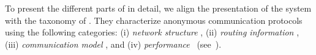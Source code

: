 

To present the different parts of \name in detail, 
we align the presentation of the system with the taxonomy of 
\textcite{RoutingSurveyAnonymousProtocols}.
They characterize anonymous communication protocols using the following 
categories: (i) \textit{network structure}%
, (ii) \textit{routing information}%
, (iii) \textit{communication model}%
, and (iv) \textit{performance}%
~(see~\cite[Table~1]{RoutingSurveyAnonymousProtocols}).


